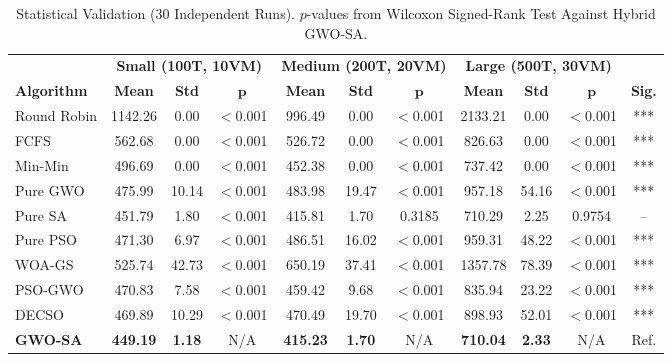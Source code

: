 \documentclass[conference]{IEEEtran}
\begin{document}
\begin{table}[!t]
\centering
\caption{Statistical Validation (30 Independent Runs). $p$-values from Wilcoxon Signed-Rank Test Against Hybrid GWO-SA.}
\label{tab:statistical}
\begin{tabular}{l ccc ccc ccc c}
\toprule
 & \multicolumn{3}{c}{\textbf{Small (100T, 10VM)}} & \multicolumn{3}{c}{\textbf{Medium (200T, 20VM)}} & \multicolumn{3}{c}{\textbf{Large (500T, 30VM)}} & \\
\cmidrule(lr){2-4} \cmidrule(lr){5-7} \cmidrule(lr){8-10}
\textbf{Algorithm} & \textbf{Mean} & \textbf{Std} & $\bm{p}$ & \textbf{Mean} & \textbf{Std} & $\bm{p}$ & \textbf{Mean} & \textbf{Std} & $\bm{p}$ & \textbf{Sig.} \\
\midrule
Round Robin  & 1142.26 & 0.00 & $<$0.001 & 996.49 & 0.00 & $<$0.001 & 2133.21 & 0.00 & $<$0.001 & *** \\
FCFS         & 562.68  & 0.00 & $<$0.001 & 526.72 & 0.00 & $<$0.001 & 826.63  & 0.00 & $<$0.001 & *** \\
Min-Min      & 496.69  & 0.00 & $<$0.001 & 452.38 & 0.00 & $<$0.001 & 737.42  & 0.00 & $<$0.001 & *** \\
Pure GWO     & 475.99  & 10.14 & $<$0.001 & 483.98 & 19.47 & $<$0.001 & 957.18 & 54.16 & $<$0.001 & *** \\
Pure SA      & 451.79  & 1.80 & $<$0.001 & 415.81 & 1.70 & 0.3185 & 710.29 & 2.25 & 0.9754 & -- \\
Pure PSO     & 471.30  & 6.97 & $<$0.001 & 486.51 & 16.02 & $<$0.001 & 959.31 & 48.22 & $<$0.001 & *** \\
WOA-GS       & 525.74  & 42.73 & $<$0.001 & 650.19 & 37.41 & $<$0.001 & 1357.78 & 78.39 & $<$0.001 & *** \\
PSO-GWO      & 470.83  & 7.58 & $<$0.001 & 459.42 & 9.68 & $<$0.001 & 835.94 & 23.22 & $<$0.001 & *** \\
DECSO        & 469.89  & 10.29 & $<$0.001 & 470.49 & 19.70 & $<$0.001 & 898.93 & 52.01 & $<$0.001 & *** \\
\textbf{GWO-SA} & \textbf{449.19} & \textbf{1.18} & N/A & \textbf{415.23} & \textbf{1.70} & N/A & \textbf{710.04} & \textbf{2.33} & N/A & Ref. \\
\bottomrule
\end{tabular}
\end{table}
\end{document}
